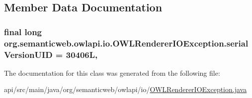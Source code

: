 \subsection{Member Data Documentation}
\hypertarget{classorg_1_1semanticweb_1_1owlapi_1_1io_1_1_o_w_l_renderer_i_o_exception_adca5d446aa849f174cac6f21f1a8d225}{
\subsubsection[{serial\-Version\-U\-I\-D}]{\setlength{\rightskip}{0pt plus 5cm}final long org.\-semanticweb.\-owlapi.\-io.\-O\-W\-L\-Renderer\-I\-O\-Exception.\-serial\-Version\-U\-I\-D = 30406\-L\hspace{0.3cm}{\ttfamily [static]}, {\ttfamily [private]}}}\label{classorg_1_1semanticweb_1_1owlapi_1_1io_1_1_o_w_l_renderer_i_o_exception_adca5d446aa849f174cac6f21f1a8d225}


The documentation for this class was generated from the following file\-:\begin{DoxyCompactItemize}
\item 
api/src/main/java/org/semanticweb/owlapi/io/\hyperlink{_o_w_l_renderer_i_o_exception_8java}{O\-W\-L\-Renderer\-I\-O\-Exception.\-java}\end{DoxyCompactItemize}

